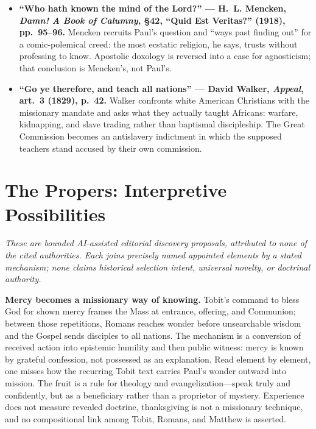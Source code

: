 \begin{deepstudy}
{\begin{itemize}
\item \textbf{``Who hath known the mind of the Lord?'' --- H.~L. Mencken, \emph{Damn! A Book of Calumny}, §42, ``Quid Est Veritas?'' (1918), pp.~95--96.} Mencken recruits Paul's question and ``ways past finding out'' for a comic-polemical creed: the most ecstatic religion, he says, trusts without professing to know. Apostolic doxology is reversed into a case for agnosticism; that conclusion is Mencken's, not Paul's.

\item \textbf{``Go ye therefore, and teach all nations'' --- David Walker, \emph{Appeal}, art.~3 (1829), p.~42.} Walker confronts white American Christians with the missionary mandate and asks what they actually taught Africans: warfare, kidnapping, and slave trading rather than baptismal discipleship. The Great Commission becomes an antislavery indictment in which the supposed teachers stand accused by their own commission.
\end{itemize}
}

\section*{The Propers: Interpretive Possibilities}

\noindent\emph{These are bounded AI-assisted editorial discovery proposals, attributed to none of the cited authorities. Each joins precisely named appointed elements by a stated mechanism; none claims historical selection intent, universal novelty, or doctrinal authority.}

\noindent\textbf{Mercy becomes a missionary way of knowing.\enspace{}}
Tobit's command to bless God for shown mercy frames the Mass at entrance, offering, and Communion; between those repetitions, Romans reaches wonder before unsearchable wisdom and the Gospel sends disciples to all nations. The mechanism is a conversion of received action into epistemic humility and then public witness: mercy is known by grateful confession, not possessed as an explanation. Read element by element, one misses how the recurring Tobit text carries Paul's wonder outward into mission. The fruit is a rule for theology and evangelization---speak truly and confidently, but as a beneficiary rather than a proprietor of mystery. Experience does not measure revealed doctrine, thanksgiving is not a missionary technique, and no compositional link among Tobit, Romans, and Matthew is asserted.


\end{deepstudy}

